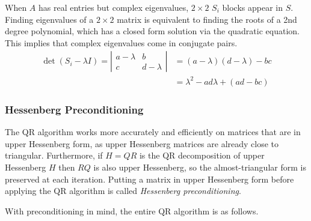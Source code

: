 When $A$ has real entries but complex eigenvalues, $2 \times 2$ $S_i$ blocks appear in $S$.
Finding eigenvalues of a $2 \times 2$ matrix is equivalent to finding the roots of a 2nd degree polynomial, which has a closed form solution via the quadratic equation.
This implies that complex eigenvalues come in conjugate pairs.
%
\begin{align}
\nonumber \det(S_i - \lambda I) =
\left|\begin{array}{cc}
a - \lambda & b           \\
c           & d - \lambda
\end{array}\right|
&= (a - \lambda)(d - \lambda) - bc \\
&= \lambda^2 - ad\lambda + (ad - bc) \label{eq:qr-algorithm-roots}
\end{align}

\subsubsection*{Hessenberg Preconditioning} %

The QR algorithm works more accurately and efficiently on matrices that are in upper Hessenberg form, as upper Hessenberg matrices are already close to triangular.
Furthermore, if $H = QR$ is the QR decomposition of upper Hessenberg $H$ then $RQ$ is also upper Hessenberg, so the almost-triangular form is preserved at each iteration.
Putting a matrix in upper Hessenberg form before applying the QR algorithm is called \emph{Hessenberg preconditioning}.


With preconditioning in mind, the entire QR algorithm is as follows.

